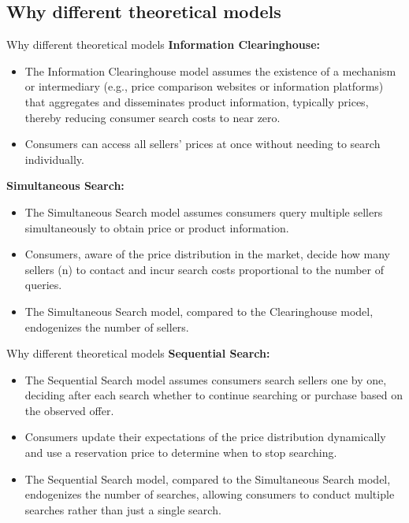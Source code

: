 \documentclass[aspectratio=169]{beamer}  %
\begin{document}
\subsection{Why different theoretical models}
\begin{frame}{Why different theoretical models}
    \textbf{Information Clearinghouse:}
    \begin{itemize}
        \item The Information Clearinghouse model assumes the existence of a mechanism or intermediary (e.g., price comparison websites or information platforms) that aggregates and disseminates product information, typically prices, thereby reducing consumer search costs to near zero. 
        \item Consumers can access all sellers’ prices at once without needing to search individually.
    \end{itemize}
    \textbf{Simultaneous Search:}
    \begin{itemize}
        \item The Simultaneous Search model assumes consumers query multiple sellers simultaneously to obtain price or product information.
        \item Consumers, aware of the price distribution in the market, decide how many sellers (n) to contact and incur search costs proportional to the number of queries.
        \item The Simultaneous Search model, compared to the Clearinghouse model, endogenizes the number of sellers.
    \end{itemize}
    
\end{frame}

\begin{frame}{Why different theoretical models}
    \textbf{Sequential Search:}
    \begin{itemize}
        \item The Sequential Search model assumes consumers search sellers one by one, deciding after each search whether to continue searching or purchase based on the observed offer.
        \item Consumers update their expectations of the price distribution dynamically and use a reservation price to determine when to stop searching.
        \item The Sequential Search model, compared to the Simultaneous Search model, endogenizes the number of searches, allowing consumers to conduct multiple searches rather than just a single search.
    \end{itemize}
\end{frame}
\end{document}
